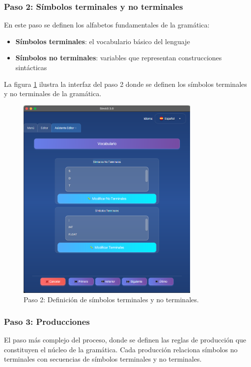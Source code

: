 \subsubsection{Paso 2: Símbolos terminales y no terminales}

En este paso se definen los alfabetos fundamentales de la gramática:
\begin{itemize}
 \item \textbf{Símbolos terminales}: el vocabulario básico del lenguaje
 \item \textbf{Símbolos no terminales}: variables que representan construcciones sintácticas
\end{itemize}

La figura \ref{fig:paso2} ilustra la interfaz del paso 2 donde se definen los símbolos terminales y no terminales de la gramática.

\needspace{6cm}
\begin{figure}[H]
\centering
\includegraphics[width=0.8\textwidth]{figuras2/editor/paso2_simbolos.png}
\caption{Paso 2: Definición de símbolos terminales y no terminales.}
\label{fig:paso2}
\end{figure}

\subsubsection{Paso 3: Producciones}

El paso más complejo del proceso, donde se definen las reglas de producción que constituyen el núcleo de la gramática. Cada producción relaciona símbolos no terminales con secuencias de símbolos terminales y no terminales.

